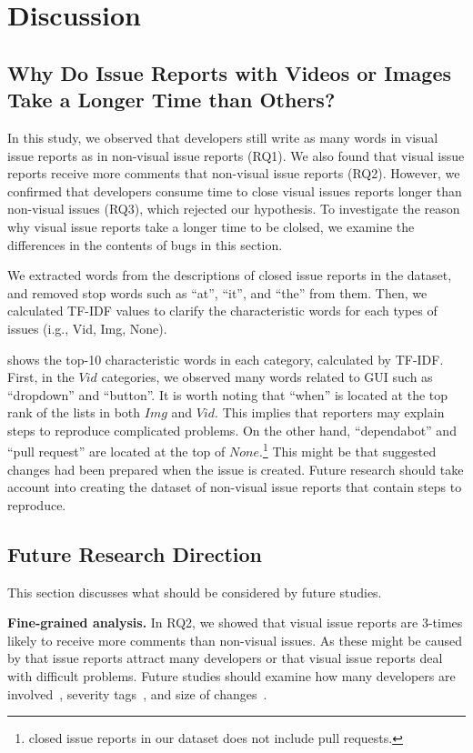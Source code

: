 \section{Discussion}
%
\subsection{Why Do Issue Reports with Videos or Images Take a Longer Time than Others?}
In this study, we observed that developers still write as many words in visual issue reports as in non-visual issue reports (RQ1). 
We also found that visual issue reports receive more comments that non-visual issue reports (RQ2). 
However, we confirmed that developers consume time to close visual issues reports longer than non-visual issues (RQ3), which rejected our hypothesis. 
To investigate the reason why visual issue reports take a longer time to be clolsed, we examine the differences in the contents of bugs in this section. 

We extracted words from the descriptions of closed issue reports in the dataset, and  removed stop words such as ``at'', ``it'', and ``the'' from them. 
Then, we calculated TF-IDF values to clarify the characteristic words for each types of issues (i.g., Vid, Img, None). 

 shows the top-10 characteristic words in each category, calculated by TF-IDF.
First, in the $Vid$ categories, we observed many words  related to GUI such as ``dropdown'' and ``button''. It is worth noting that ``when'' is located at the top rank of the lists in both $Img$ and $Vid$. 
This implies that reporters may explain steps to reproduce complicated problems. 
On the other hand, ``dependabot'' and ``pull request'' are located at the top of  $None$.\footnote{closed issue reports in our dataset does not include pull requests.} 
This might be that suggested changes had been prepared when the issue is created. 
Future research should take account into creating the dataset of non-visual issue reports that contain steps to reproduce. 



\subsection{Future Research Direction}
This section discusses what should be considered by future studies. 

\noindent
\textbf{Fine-grained analysis. }
In RQ2, we showed that visual issue reports are 3-times likely to receive more comments than non-visual issues. As these might be caused by that  issue reports attract many developers or that visual issue reports deal with difficult problems. Future studies should examine how many developers are involved~\citep{DBLP:conf/icsm/BavotaR15}, severity tags~\citep{DBLP:conf/issre/ZhouNG15}, and size of changes~\citep{DBLP:conf/kbse/HattoriL08}.

